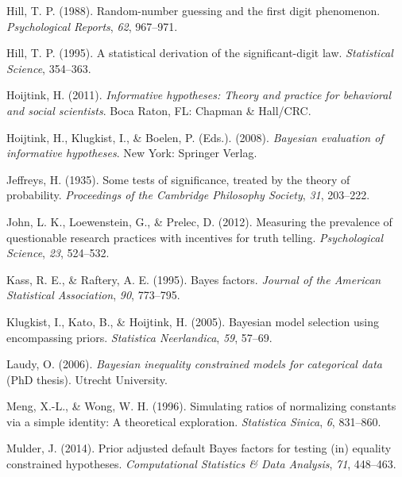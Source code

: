 \documentclass[
  english,
  man,floatsintext]{apa6}
\begin{document}
\leavevmode\hypertarget{ref-hill1988random}{}%
Hill, T. P. (1988). Random-number guessing and the first digit phenomenon. \emph{Psychological Reports}, \emph{62}, 967--971.

\leavevmode\hypertarget{ref-hill1995statistical}{}%
Hill, T. P. (1995). A statistical derivation of the significant-digit law. \emph{Statistical Science}, 354--363.

\leavevmode\hypertarget{ref-hoijtink2011informative}{}%
Hoijtink, H. (2011). \emph{Informative hypotheses: Theory and practice for behavioral and social scientists}. Boca Raton, FL: Chapman \& Hall/CRC.

\leavevmode\hypertarget{ref-hoijtink2008bayesian}{}%
Hoijtink, H., Klugkist, I., \& Boelen, P. (Eds.). (2008). \emph{Bayesian evaluation of informative hypotheses}. New York: Springer Verlag.

\leavevmode\hypertarget{ref-jeffreys1935some}{}%
Jeffreys, H. (1935). Some tests of significance, treated by the theory of probability. \emph{Proceedings of the Cambridge Philosophy Society}, \emph{31}, 203--222.

\leavevmode\hypertarget{ref-john2012measuring}{}%
John, L. K., Loewenstein, G., \& Prelec, D. (2012). Measuring the prevalence of questionable research practices with incentives for truth telling. \emph{Psychological Science}, \emph{23}, 524--532.

\leavevmode\hypertarget{ref-kass1995bayes}{}%
Kass, R. E., \& Raftery, A. E. (1995). Bayes factors. \emph{Journal of the American Statistical Association}, \emph{90}, 773--795.

\leavevmode\hypertarget{ref-klugkist2005bayesian}{}%
Klugkist, I., Kato, B., \& Hoijtink, H. (2005). Bayesian model selection using encompassing priors. \emph{Statistica Neerlandica}, \emph{59}, 57--69.

\leavevmode\hypertarget{ref-laudy2006bayesian}{}%
Laudy, O. (2006). \emph{Bayesian inequality constrained models for categorical data} (PhD thesis). Utrecht University.

\leavevmode\hypertarget{ref-meng1996simulating}{}%
Meng, X.-L., \& Wong, W. H. (1996). Simulating ratios of normalizing constants via a simple identity: A theoretical exploration. \emph{Statistica Sinica}, \emph{6}, 831--860.

\leavevmode\hypertarget{ref-mulder2014prior}{}%
Mulder, J. (2014). Prior adjusted default Bayes factors for testing (in) equality constrained hypotheses. \emph{Computational Statistics \& Data Analysis}, \emph{71}, 448--463.
\end{document}
